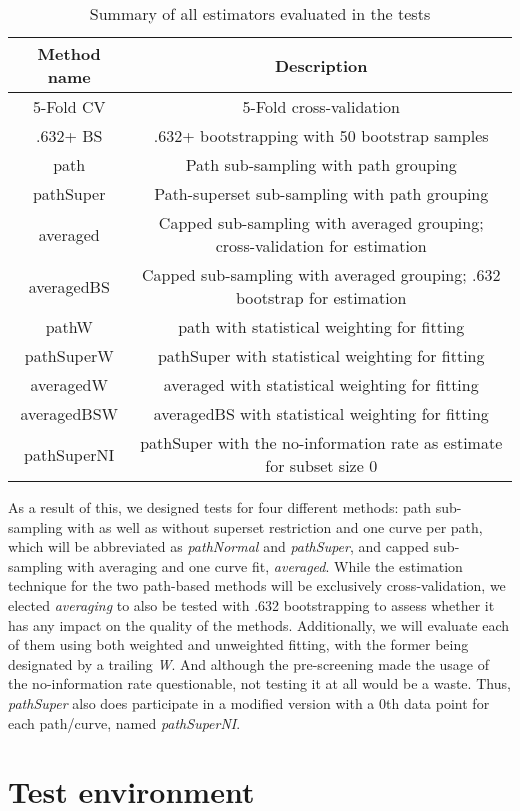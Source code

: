 \begin{table}[h]
\centering
\begin{tabular}{c | c}
Method name & Description\\
\hline
5-Fold CV & 5-Fold cross-validation\\
.632+ BS & .632+ bootstrapping with 50 bootstrap samples\\
path & Path sub-sampling with path grouping\\
pathSuper & Path-superset sub-sampling with path grouping\\
averaged & Capped sub-sampling with averaged grouping; cross-validation for estimation\\
averagedBS & Capped sub-sampling with averaged grouping; .632 bootstrap for estimation\\
pathW & path with statistical weighting for fitting\\
pathSuperW & pathSuper with statistical weighting for fitting\\
averagedW & averaged with statistical weighting for fitting\\
averagedBSW & averagedBS with statistical weighting for fitting\\
pathSuperNI & pathSuper with the no-information rate as estimate for subset size 0
\end{tabular}
\caption{Summary of all estimators evaluated in the tests}
\label{tab:allEstimators}
\end{table}

As a result of this, we designed tests for four different methods: path sub-sampling with as well as without superset restriction and one curve per path, which will be abbreviated as \textit{pathNormal} and \textit{pathSuper}, and capped sub-sampling with averaging and one curve fit, \textit{averaged}. While the estimation technique for the two path-based methods will be exclusively cross-validation, we elected \textit{averaging} to also be tested with .632 bootstrapping to assess whether it has any impact on the quality of the methods. Additionally, we will evaluate each of them using both weighted and unweighted fitting, with the former being designated by a trailing \textit{W}. And although the pre-screening made the usage of the no-information rate questionable, not testing it at all would be a waste. Thus, \textit{pathSuper} also does participate in a modified version with a 0th data point for each path/curve, named \textit{pathSuperNI}.

\section{Test environment}

